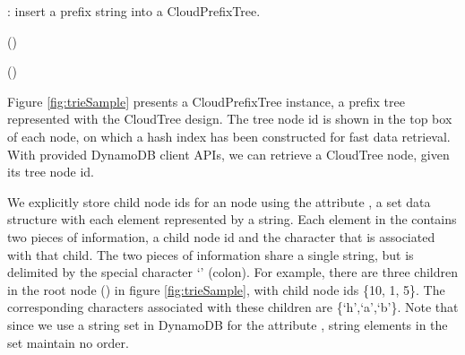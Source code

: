\documentclass[10pt, conference, compsocconf]{IEEEtran}
\newcommand{\remove}[1]{}
\begin{document}
\remove{
\begin{algorithm}[t]
{\small
  \caption{: Query whether a prefix string  exits in a CloudPrefixTree. If found, return true, otherwise return false.}
\label{algo:triequery}

\KwIn{The query string .} 


\smallskip 

\tcc{Start the search with root node, with id = .}
\;

\smallskip

\For{}{


\tcc{Whether in current node there is a child associated with character .}
\;

  \If(\tcp*[f]{Such a child for  exists.}){}{\;}
  \Else
   {\;}
}
\;
}
\end{algorithm}
}

\begin{algorithm}[t]
{\small
  \caption{: insert a prefix string  into a CloudPrefixTree.}
\label{algo:trieinsert}



\smallskip 

\If(){}{}

\;

\smallskip

\For{}{
\;
\smallskip
\;
\;
}
\If(){}{\; }
}
\end{algorithm}


Figure \ref{fig:trieSample} presents a CloudPrefixTree instance, 
a prefix tree represented with the CloudTree design.
The tree node id is shown in the top box of each node,
on which a hash index has been constructed for fast data retrieval.
With provided DynamoDB client APIs,
we can retrieve a CloudTree node, given its tree node id.

We explicitly store child node ids for an node using the attribute , 
a set data structure with each element represented by a string.
Each element in the  contains two pieces of information,
 a child node id and the character
that is associated with that child. The two pieces of information share a single string, but 
is delimited by the special character `' (colon).
For example, there are three children in the root node () in figure \ref{fig:trieSample},
with child node ids \{10, 1, 5\}. The corresponding characters associated with
these children are \{`h',`a',`b'\}.
Note that since we use a string set in DynamoDB for the attribute , 
string elements in the set maintain no order.
\end{document}
